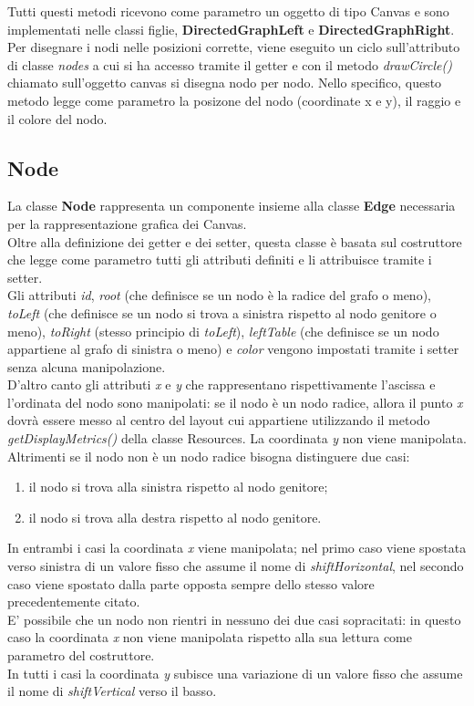 \documentclass[a4paper,11pt,twoside,openright]{report}
\begin{document}
Tutti questi metodi ricevono come parametro un oggetto di tipo Canvas e sono implementati nelle classi figlie, \textbf{DirectedGraphLeft} e \textbf{DirectedGraphRight}.\\
Per disegnare i nodi nelle posizioni corrette, viene eseguito un ciclo sull'attributo di classe \textit{nodes} a cui si ha accesso tramite il getter e con il metodo \textit{drawCircle()} chiamato sull'oggetto canvas si disegna nodo per nodo. Nello specifico, questo metodo legge come parametro la posizone del nodo (coordinate x e y), il raggio e il colore del nodo.

\subsection{Node}
La classe \textbf{Node} rappresenta un componente insieme alla classe \textbf{Edge} necessaria per la rappresentazione grafica dei Canvas.\\
Oltre alla definizione dei getter e dei setter, questa classe è basata sul costruttore che legge come parametro tutti gli attributi definiti e li attribuisce tramite i setter.\\
Gli attributi \textit{id}, \textit{root} (che definisce se un nodo è la radice del grafo o meno), \textit{toLeft} (che definisce se un nodo si trova a sinistra rispetto al nodo genitore o meno), \textit{toRight} (stesso principio di \textit{toLeft}), \textit{leftTable} (che definisce se un nodo appartiene al grafo di sinistra o meno) e \textit{color} vengono impostati tramite i setter senza alcuna manipolazione.\\
D'altro canto gli attributi \textit{x} e \textit{y} che rappresentano rispettivamente l'ascissa e l'ordinata del nodo sono manipolati: se il nodo è un nodo radice, allora il punto \textit{x} dovrà essere messo al centro del layout cui appartiene utilizzando il metodo \textit{getDisplayMetrics()} della classe Resources. La coordinata \textit{y} non viene manipolata. \\
Altrimenti se il nodo non è un nodo radice bisogna distinguere due casi:

\begin{enumerate}
\item il nodo si trova alla sinistra rispetto al nodo genitore;

\item il nodo si trova alla destra rispetto al nodo genitore.
\end{enumerate}

In entrambi i casi la coordinata \textit{x} viene manipolata; nel primo caso viene spostata verso sinistra di un valore fisso che assume il nome di \textit{shiftHorizontal}, nel secondo caso viene spostato dalla parte opposta sempre dello stesso valore precedentemente citato.\\
E' possibile che un nodo non rientri in nessuno dei due casi sopracitati: in questo caso la coordinata \textit{x} non viene manipolata rispetto alla sua lettura come parametro del costruttore.\\
In tutti i casi la coordinata \textit{y} subisce una variazione di un valore fisso che assume il nome di \textit{shiftVertical} verso il basso.
\end{document}
